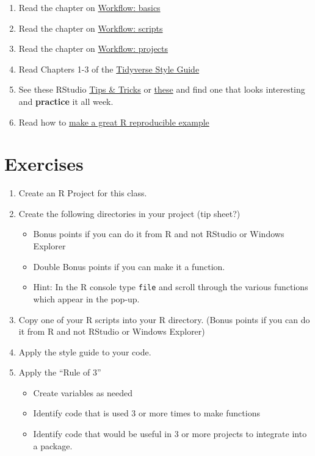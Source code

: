 \documentclass[]{book}
\providecommand{\tightlist}{%
  \setlength{\itemsep}{0pt}\setlength{\parskip}{0pt}}
\theoremstyle{definition}
\theoremstyle{definition}
\theoremstyle{definition}
\theoremstyle{remark}
\begin{document}
\begin{enumerate}
\def\labelenumi{\arabic{enumi}.}
\tightlist
\item
  Read the chapter on
  \href{http://r4ds.had.co.nz/workflow-basics.html}{Workflow: basics}
\item
  Read the chapter on
  \href{http://r4ds.had.co.nz/workflow-scripts.html}{Workflow: scripts}
\item
  Read the chapter on
  \href{http://r4ds.had.co.nz/workflow-projects.html}{Workflow:
  projects}
\item
  Read Chapters 1-3 of the
  \href{http://style.tidyverse.org/index.html}{Tidyverse Style Guide}
\item
  See these RStudio
  \href{https://rviews.rstudio.com/categories/tips-and-tricks/}{Tips \&
  Tricks} or \href{https://twitter.com/rstudiotips}{these} and find one
  that looks interesting and \textbf{practice} it all week.
\item
  Read how to
  \href{https://stackoverflow.com/questions/5963269/how-to-make-a-great-r-reproducible-example}{make
  a great R reproducible example}
\end{enumerate}

\section{Exercises}\label{exercises}

\begin{enumerate}
\def\labelenumi{\arabic{enumi}.}
\tightlist
\item
  Create an R Project for this class.
\item
  Create the following directories in your project (tip sheet?)

  \begin{itemize}
  \tightlist
  \item
    Bonus points if you can do it from R and not RStudio or Windows
    Explorer
  \item
    Double Bonus points if you can make it a function.
  \item
    Hint: In the R console type \texttt{file} and scroll through the
    various functions which appear in the pop-up.
  \end{itemize}
\item
  Copy one of your R scripts into your R directory. (Bonus points if you
  can do it from R and not RStudio or Windows Explorer)
\item
  Apply the style guide to your code.\\
\item
  Apply the ``Rule of 3''

  \begin{itemize}
  \tightlist
  \item
    Create variables as needed
  \item
    Identify code that is used 3 or more times to make functions
  \item
    Identify code that would be useful in 3 or more projects to
    integrate into a package.
  \end{itemize}
\end{enumerate}
\end{document}

